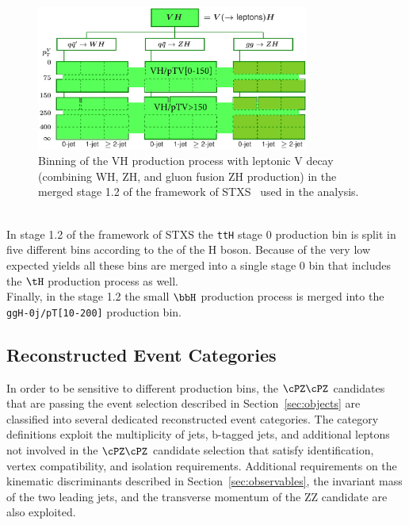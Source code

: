 \begin{figure}[!htb]
	\vspace*{0.3cm}
	\begin{center}
		\includegraphics[width=0.8\textwidth]{Figures/stxs/simplifiedXS_VH_11.pdf}
		\caption{Binning of the VH production process with leptonic V decay (combining WH, ZH, and gluon fusion ZH production) in the merged stage 1.2 of the framework of STXS~\cite{Berger:2019wnu} used in the analysis.
		\label{fig:stage1_VH}}
	\end{center}
\end{figure}
\\
In stage 1.2 of the framework of STXS the {\tt ttH} stage 0 production bin is split in five different bins according to the \pt of the H boson.
Because of the very low expected yields all these bins are merged into a single stage 0 bin that includes the $\tH$ production process as well.
\\
Finally, in the stage 1.2 the small $\bbH$ production process is merged into the {\tt ggH-0j/pT[10-200]} production bin.


\subsection{Reconstructed Event Categories}
\label{subsec:Reco_Categories}


In order to be sensitive to different production bins, the $\cPZ\cPZ$ candidates that are passing the event selection described in Section~\ref{sec:objects} are classified into several dedicated reconstructed event categories.
The category definitions exploit the multiplicity of jets, b-tagged jets, and additional leptons not involved in the $\cPZ\cPZ$ candidate selection that satisfy identification, vertex compatibility, and isolation requirements.
Additional requirements on the kinematic discriminants described in Section~\ref{sec:observables}, the invariant mass of the two leading jets, and the transverse momentum of the ZZ candidate are also exploited.

